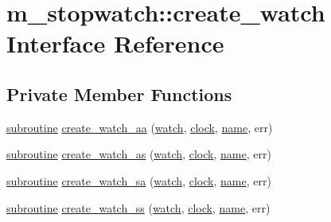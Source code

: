 \hypertarget{interfacem__stopwatch_1_1create__watch}{}\section{m\+\_\+stopwatch\+:\+:create\+\_\+watch Interface Reference}
\label{interfacem__stopwatch_1_1create__watch}
\subsection*{Private Member Functions}
\begin{DoxyCompactItemize}
\item 
\hyperlink{M__stopwatch_83_8txt_acfbcff50169d691ff02d4a123ed70482}{subroutine} \hyperlink{interfacem__stopwatch_1_1create__watch_a360c0d9583467f8239061dd6b891a744}{create\+\_\+watch\+\_\+aa} (\hyperlink{read__watch_83_8txt_ad2129669fa47b8899641309620add095}{watch}, \hyperlink{stop__watch_83_8txt_a148c035b430d6edf5413dbd2704facfb}{clock}, \hyperlink{M__stopwatch_83_8txt_a3f508a893ae4c3b397b4383e33b9bcae}{name}, err)
\item 
\hyperlink{M__stopwatch_83_8txt_acfbcff50169d691ff02d4a123ed70482}{subroutine} \hyperlink{interfacem__stopwatch_1_1create__watch_a36f32fa4541cbc26afc54c6ec4fa91d4}{create\+\_\+watch\+\_\+as} (\hyperlink{read__watch_83_8txt_ad2129669fa47b8899641309620add095}{watch}, \hyperlink{stop__watch_83_8txt_a148c035b430d6edf5413dbd2704facfb}{clock}, \hyperlink{M__stopwatch_83_8txt_a3f508a893ae4c3b397b4383e33b9bcae}{name}, err)
\item 
\hyperlink{M__stopwatch_83_8txt_acfbcff50169d691ff02d4a123ed70482}{subroutine} \hyperlink{interfacem__stopwatch_1_1create__watch_a4aedfa5908a415450b0633bf8e2e4d08}{create\+\_\+watch\+\_\+sa} (\hyperlink{read__watch_83_8txt_ad2129669fa47b8899641309620add095}{watch}, \hyperlink{stop__watch_83_8txt_a148c035b430d6edf5413dbd2704facfb}{clock}, \hyperlink{M__stopwatch_83_8txt_a3f508a893ae4c3b397b4383e33b9bcae}{name}, err)
\item 
\hyperlink{M__stopwatch_83_8txt_acfbcff50169d691ff02d4a123ed70482}{subroutine} \hyperlink{interfacem__stopwatch_1_1create__watch_afbf377b4aee9a7c482a2275cddb63fb7}{create\+\_\+watch\+\_\+ss} (\hyperlink{read__watch_83_8txt_ad2129669fa47b8899641309620add095}{watch}, \hyperlink{stop__watch_83_8txt_a148c035b430d6edf5413dbd2704facfb}{clock}, \hyperlink{M__stopwatch_83_8txt_a3f508a893ae4c3b397b4383e33b9bcae}{name}, err)
\end{DoxyCompactItemize}


